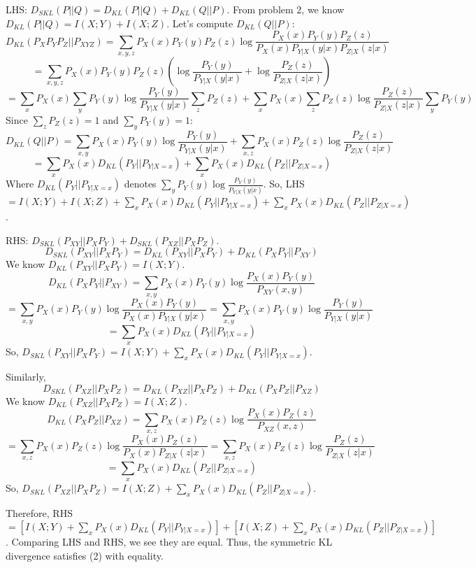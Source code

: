 \documentclass{article}
\begin{document}
LHS: $D_{SKL}(P || Q) = D_{KL}(P || Q) + D_{KL}(Q || P)$.
From problem 2, we know $D_{KL}(P || Q) = I(X;Y) + I(X;Z)$.
Let's compute $D_{KL}(Q || P)$:
\[ D_{KL}(P_X P_Y P_Z || P_{XYZ}) = \sum_{x,y,z} P_X(x) P_Y(y) P_Z(z) \log \frac{P_X(x) P_Y(y) P_Z(z)}{P_X(x) P_{Y|X}(y|x) P_{Z|X}(z|x)} \]
\[ = \sum_{x,y,z} P_X(x) P_Y(y) P_Z(z) \left( \log \frac{P_Y(y)}{P_{Y|X}(y|x)} + \log \frac{P_Z(z)}{P_{Z|X}(z|x)} \right) \]
\[ = \sum_x P_X(x) \sum_y P_Y(y) \log \frac{P_Y(y)}{P_{Y|X}(y|x)} \sum_z P_Z(z) + \sum_x P_X(x) \sum_z P_Z(z) \log \frac{P_Z(z)}{P_{Z|X}(z|x)} \sum_y P_Y(y) \]
Since $\sum_z P_Z(z) = 1$ and $\sum_y P_Y(y) = 1$:
\[ D_{KL}(Q || P) = \sum_{x,y} P_X(x) P_Y(y) \log \frac{P_Y(y)}{P_{Y|X}(y|x)} + \sum_{x,z} P_X(x) P_Z(z) \log \frac{P_Z(z)}{P_{Z|X}(z|x)} \]
\[ = \sum_x P_X(x) D_{KL}(P_Y || P_{Y|X=x}) + \sum_x P_X(x) D_{KL}(P_Z || P_{Z|X=x}) \]
Where $D_{KL}(P_Y || P_{Y|X=x})$ denotes $\sum_y P_Y(y) \log \frac{P_Y(y)}{P_{Y|X}(y|x)}$.
So, LHS $= I(X;Y) + I(X;Z) + \sum_x P_X(x) D_{KL}(P_Y || P_{Y|X=x}) + \sum_x P_X(x) D_{KL}(P_Z || P_{Z|X=x})$.

RHS: $D_{SKL}(P_{XY} || P_X P_Y) + D_{SKL}(P_{XZ} || P_X P_Z)$.
\[ D_{SKL}(P_{XY} || P_X P_Y) = D_{KL}(P_{XY} || P_X P_Y) + D_{KL}(P_X P_Y || P_{XY}) \]
We know $D_{KL}(P_{XY} || P_X P_Y) = I(X;Y)$.
\[ D_{KL}(P_X P_Y || P_{XY}) = \sum_{x,y} P_X(x) P_Y(y) \log \frac{P_X(x) P_Y(y)}{P_{XY}(x,y)} \]
\[ = \sum_{x,y} P_X(x) P_Y(y) \log \frac{P_X(x) P_Y(y)}{P_X(x) P_{Y|X}(y|x)} = \sum_{x,y} P_X(x) P_Y(y) \log \frac{P_Y(y)}{P_{Y|X}(y|x)} \]
\[ = \sum_x P_X(x) D_{KL}(P_Y || P_{Y|X=x}) \]
So, $D_{SKL}(P_{XY} || P_X P_Y) = I(X;Y) + \sum_x P_X(x) D_{KL}(P_Y || P_{Y|X=x})$.

Similarly,
\[ D_{SKL}(P_{XZ} || P_X P_Z) = D_{KL}(P_{XZ} || P_X P_Z) + D_{KL}(P_X P_Z || P_{XZ}) \]
We know $D_{KL}(P_{XZ} || P_X P_Z) = I(X;Z)$.
\[ D_{KL}(P_X P_Z || P_{XZ}) = \sum_{x,z} P_X(x) P_Z(z) \log \frac{P_X(x) P_Z(z)}{P_{XZ}(x,z)} \]
\[ = \sum_{x,z} P_X(x) P_Z(z) \log \frac{P_X(x) P_Z(z)}{P_X(x) P_{Z|X}(z|x)} = \sum_{x,z} P_X(x) P_Z(z) \log \frac{P_Z(z)}{P_{Z|X}(z|x)} \]
\[ = \sum_x P_X(x) D_{KL}(P_Z || P_{Z|X=x}) \]
So, $D_{SKL}(P_{XZ} || P_X P_Z) = I(X;Z) + \sum_x P_X(x) D_{KL}(P_Z || P_{Z|X=x})$.

Therefore, RHS $= [I(X;Y) + \sum_x P_X(x) D_{KL}(P_Y || P_{Y|X=x})] + [I(X;Z) + \sum_x P_X(x) D_{KL}(P_Z || P_{Z|X=x})]$.
Comparing LHS and RHS, we see they are equal.
Thus, the symmetric KL divergence satisfies (2) with equality.
\end{document}
